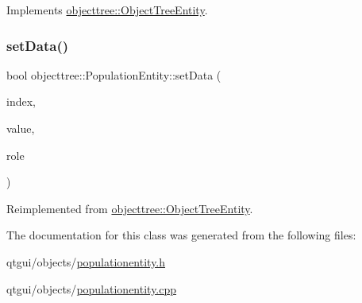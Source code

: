 Implements \mbox{\hyperlink{classobjecttree_1_1_object_tree_entity_a82c626bb28c55dcfce11cf7ec3368588}{objecttree\+::\+Object\+Tree\+Entity}}.

\mbox{\label{classobjecttree_1_1_population_entity_ac7f56619658a100d8afd9418df96463b}} 
\subsubsection{\texorpdfstring{setData()}{setData()}}
{\footnotesize\ttfamily bool objecttree\+::\+Population\+Entity\+::set\+Data (\begin{DoxyParamCaption}\item[{const Q\+Model\+Index \&}]{index,  }\item[{const Q\+Variant \&}]{value,  }\item[{int}]{role }\end{DoxyParamCaption})\hspace{0.3cm}{\ttfamily [virtual]}}



Reimplemented from \mbox{\hyperlink{classobjecttree_1_1_object_tree_entity_ab6742194e637093cb1571998bee88ff5}{objecttree\+::\+Object\+Tree\+Entity}}.



The documentation for this class was generated from the following files\+:\begin{DoxyCompactItemize}
\item 
qtgui/objects/\mbox{\hyperlink{populationentity_8h}{populationentity.\+h}}\item 
qtgui/objects/\mbox{\hyperlink{populationentity_8cpp}{populationentity.\+cpp}}\end{DoxyCompactItemize}
